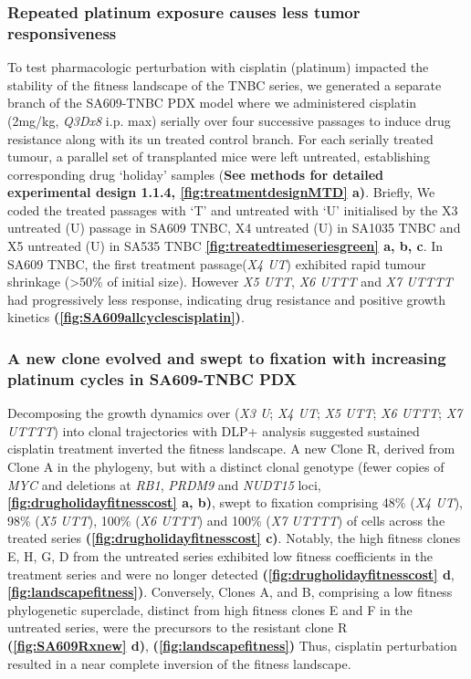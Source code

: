 \subsubsection{Repeated platinum exposure causes less tumor responsiveness} 
 To test pharmacologic perturbation with cisplatin (platinum) impacted the stability of the fitness landscape of the TNBC series, we generated a separate branch of the SA609-TNBC PDX model where we administered cisplatin (2mg/kg, \textit{Q3Dx8} i.p. max) serially over four successive passages to induce drug resistance along with its un treated control branch. For each serially treated tumour, a parallel set of transplanted mice were left untreated, establishing corresponding drug `holiday' samples (\textbf{See methods for detailed experimental design \textbf{1.1.4}, \textbf{\autoref{fig:treatmentdesignMTD} a)}}. Briefly, We coded the treated passages with `T' and untreated with `U' initialised by the X3 untreated (U) passage in SA609 TNBC, X4 untreated (U) in SA1035 TNBC and X5 untreated (U) in SA535 TNBC \textbf{\autoref{fig:treatedtimeseriesgreen} a, b, c}. In SA609 TNBC, the first treatment passage(\textit{X4 UT}) exhibited rapid tumour shrinkage (>50\% of initial size). However \textit{X5 UTT}, \textit{X6 UTTT} and \textit{X7 UTTTT} had progressively less response, indicating drug resistance and positive growth kinetics \textbf{(\autoref{fig:SA609allcyclescisplatin})}. 


\subsubsection{A new clone evolved and swept to fixation with increasing platinum cycles in SA609-TNBC PDX}
Decomposing the growth dynamics over (\textit{X3 U}; \textit{X4 UT}; \textit{X5 UTT}; \textit{X6 UTTT}; \textit{X7 UTTTT}) into clonal trajectories with DLP+ analysis suggested sustained cisplatin treatment inverted the fitness landscape. A new Clone R, derived from Clone A in the phylogeny, but with a distinct clonal genotype (fewer copies of \textit{MYC} and deletions at \textit{RB1}, \textit{PRDM9} and \textit{NUDT15} loci, \textbf{\autoref{fig:drugholidayfitnesscost} a, b)}, swept to fixation comprising 48\% (\textit{X4 UT}), 98\% (\textit{X5 UTT}), 100\% (\textit{X6 UTTT}) and 100\% (\textit{X7 UTTTT}) of cells across the treated series \textbf{(\autoref{fig:drugholidayfitnesscost} c)}. Notably, the high fitness clones E, H, G, D from the untreated series exhibited low fitness coefficients in the treatment series and were no longer detected \textbf{(\autoref{fig:drugholidayfitnesscost} d}, \textbf{\autoref{fig:landscapefitness})}. Conversely, Clones A, and B, comprising a low fitness phylogenetic superclade, distinct from high fitness clones E and F in the untreated series, were the precursors to the resistant clone R \textbf{(\autoref{fig:SA609Rxnew} d)},    \textbf{(\autoref{fig:landscapefitness})} Thus, cisplatin perturbation resulted in a near complete inversion of the fitness landscape.

